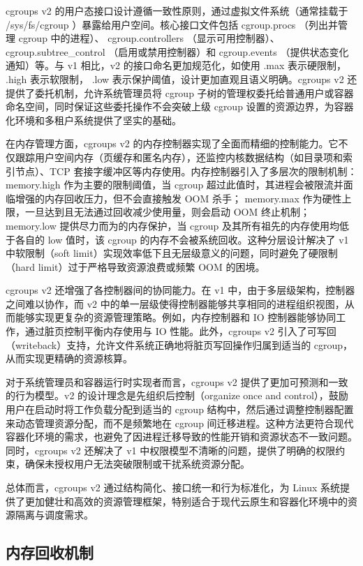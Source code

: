 cgroups v2 的用户态接口设计遵循一致性原则，通过虚拟文件系统（通常挂载于 /sys/fs/cgroup ）暴露给用户空间。核心接口文件包括 cgroup.procs （列出并管理 cgroup 中的进程）、 cgroup.controllers （显示可用控制器）、 cgroup.subtree\_control （启用或禁用控制器）和 cgroup.events （提供状态变化通知）等。与 v1 相比，v2 的接口命名更加规范化，如使用 .max 表示硬限制， .high 表示软限制， .low 表示保护阈值，设计更加直观且语义明确。cgroups v2 还提供了委托机制，允许系统管理员将 cgroup 子树的管理权委托给普通用户或容器命名空间，同时保证这些委托操作不会突破上级 cgroup 设置的资源边界，为容器化环境和多租户系统提供了坚实的基础。

在内存管理方面，cgroups v2 的内存控制器实现了全面而精细的控制能力。它不仅跟踪用户空间内存（页缓存和匿名内存），还监控内核数据结构（如目录项和索引节点）、TCP 套接字缓冲区等内存使用。内存控制器引入了多层次的限制机制： memory.high 作为主要的限制阈值，当 cgroup 超过此值时，其进程会被限流并面临增强的内存回收压力，但不会直接触发 OOM 杀手； memory.max 作为硬性上限，一旦达到且无法通过回收减少使用量，则会启动 OOM 终止机制； memory.low 提供尽力而为的内存保护，当 cgroup 及其所有祖先的内存使用均低于各自的 low 值时，该 cgroup 的内存不会被系统回收。这种分层设计解决了 v1 中软限制（soft limit）实现效率低下且无层级意义的问题，同时避免了硬限制（hard limit）过于严格导致资源浪费或频繁 OOM 的困境。

cgroups v2 还增强了各控制器间的协同能力。在 v1 中，由于多层级架构，控制器之间难以协作，而 v2 中的单一层级使得控制器能够共享相同的进程组织视图，从而能够实现更复杂的资源管理策略。例如，内存控制器和 IO 控制器能够协同工作，通过脏页控制平衡内存使用与 IO 性能。此外，cgroups v2 引入了可写回（writeback）支持，允许文件系统正确地将脏页写回操作归属到适当的 cgroup，从而实现更精确的资源核算。

对于系统管理员和容器运行时实现者而言，cgroups v2 提供了更加可预测和一致的行为模型。v2 的设计理念是先组织后控制（organize once and control），鼓励用户在启动时将工作负载分配到适当的 cgroup 结构中，然后通过调整控制器配置来动态管理资源分配，而不是频繁地在 cgroup 间迁移进程。这种方法更符合现代容器化环境的需求，也避免了因进程迁移导致的性能开销和资源状态不一致问题。同时，cgroups v2 还解决了 v1 中权限模型不清晰的问题，提供了明确的权限约束，确保未授权用户无法突破限制或干扰系统资源分配。

总体而言，cgroups v2 通过结构简化、接口统一和行为标准化，为 Linux 系统提供了更加健壮和高效的资源管理框架，特别适合于现代云原生和容器化环境中的资源隔离与调度需求。

\subsection{内存回收机制}
\label{sec:Linux内存回收机制}

